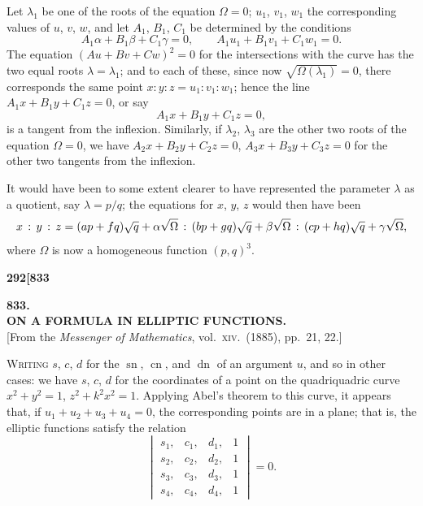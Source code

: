 \documentclass[11pt]{article}
\begin{document}
\medskip

Let $\lambda_{1}$ be one of the roots of the equation $\Omega = 0$; $u_{1}$, $v_{1}$, $w_{1}$ the corresponding values of $u$, $v$, $w$, and let $A_{1}$, $B_{1}$, $C_{1}$ be determined by the conditions
\[
A_{1}\alpha + B_{1}\beta + C_{1}\gamma = 0,\qquad A_{1}u_{1} + B_{1}v_{1} + C_{1}w_{1} = 0.
\]
The equation $(Au + Bv + Cw)^{2} = 0$ for the intersections with the curve has the two equal roots $\lambda = \lambda_{1}$; and to each of these, since now $\sqrt{\Omega(\lambda_{1})} = 0$, there corresponds the same point $x : y : z = u_{1} : v_{1} : w_{1}$; hence the line $A_{1}x + B_{1}y + C_{1}z = 0$, or say
\[
A_{1}x + B_{1}y + C_{1}z = 0,
\]
is a tangent from the inflexion. Similarly, if $\lambda_{2}$, $\lambda_{3}$ are the other two roots of the equation $\Omega = 0$, we have $A_{2}x + B_{2}y + C_{2}z = 0$, $A_{3}x + B_{3}y + C_{3}z = 0$ for the other two tangents from the inflexion.

\medskip

It would have been to some extent clearer to have represented the parameter $\lambda$ as a quotient, say $\lambda = p/q$; the equations for $x$, $y$, $z$ would then have been
\[
\resizebox{\textwidth}{!}{$\displaystyle
x \,:\, y \,:\, z = (ap + fq)\sqrt{q} + \alpha\sqrt{\Omega} \,:\, (bp + gq)\sqrt{q} + \beta\sqrt{\Omega} \,:\, (cp + hq)\sqrt{q} + \gamma\sqrt{\Omega},
$}
\]
where $\Omega$ is now a homogeneous function $(p, q)^{3}$.


\newpage

\noindent\textbf{292}\hfill\hfill\textbf{[833}

\bigskip

\begin{center}
{\large\textbf{833.}}\\[0.7em]
{\large\textbf{ON A FORMULA IN ELLIPTIC FUNCTIONS.}}\\[1em]
{\small [From the \textit{Messenger of Mathematics}, vol.\ \textsc{xiv}.\ (1885), pp.\ 21, 22.]}
\end{center}

\bigskip

\noindent \textsc{Writing} $s$, $c$, $d$ for the $\operatorname{sn}$, $\operatorname{cn}$, and $\operatorname{dn}$ of an argument $u$, and so in other cases: we have $s$, $c$, $d$ for the coordinates of a point on the quadriquadric curve $x^{2} + y^{2} = 1$, $z^{2} + k^{2}x^{2} = 1$. Applying Abel's theorem to this curve, it appears that, if $u_{1} + u_{2} + u_{3} + u_{4} = 0$, the corresponding points are in a plane; that is, the elliptic functions satisfy the relation
\[
\begin{vmatrix}
s_{1}, & c_{1}, & d_{1}, & 1 \\
s_{2}, & c_{2}, & d_{2}, & 1 \\
s_{3}, & c_{3}, & d_{3}, & 1 \\
s_{4}, & c_{4}, & d_{4}, & 1
\end{vmatrix}
= 0.
\]
\end{document}
